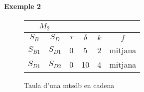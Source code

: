 \paragraph{Exemple 2}

\begin{figure}[tp]
  \centering
  \begin{tabular}{|c|c|c|c|c|c|}
    \multicolumn{2}{c}{$M_2$} \\ \hline
    $S_B$  & $S_D$ & $\tau$ & $\delta$ & $k$ & $f$ \\ \hline
    $S_{B1}$ & $S_{D1}$ & 0 & 5  & 2 & mitjana  \\
    $S_{D1}$ & $S_{D2}$ & 0 & 10 & 4 & mitjana  \\ \hline
  \end{tabular}
  \caption{Taula d'una mtsdb en cadena}
  \label{fig:model:mtsdb:cadena}
\end{figure}







